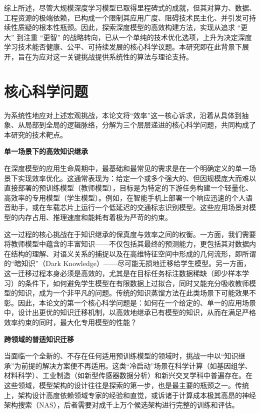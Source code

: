 \documentclass[../main.tex]{subfiles}
\begin{document}
综上所述，尽管大规模深度学习模型已取得里程碑式的成就，但其对算力、数据、工程资源的极端依赖，已构成一个限制其应用广度、阻碍技术民主化、并引发可持续性质疑的根本性瓶颈。因此，探索深度模型的高效构建方法，实现从追求 “更大” 到注重 “更智” 的战略转向，已从一个单纯的技术优化选项，上升为决定深度学习技术能否健康、公平、可持续发展的核心科学议题。本研究即在此背景下展开，旨在为应对这一关键挑战提供系统性的算法与理论支持。

\section[\hspace{-2pt}核心科学问题]{{\heiti{} \hspace{-8pt}核心科学问题}}\label{sec:core-scientific-issues}

为系统性地应对上述宏观挑战，本论文将“效率”这一核心诉求，沿着从具体到抽象、从局部到全局的逻辑脉络，分解为三个层层递进的核心科学问题，共同构成了本研究的技术靶点。

\textbf{ 单一场景下的高效知识继承}

在深度模型的应用生命周期中，最基础和最常见的需求是在一个明确定义的单一场景下实现效率优化。这通常表现为：给定一个或多个强大的、但因规模庞大而难以直接部署的预训练模型（教师模型），目标是为特定的下游任务构建一个轻量化、高效率的专用模型（学生模型）。例如，在智能手机上部署一个响应迅速的个人语音助手，或在车载芯片上运行一个低延迟的交通标志识别模型。这些应用场景对模型的内存占用、推理速度和能耗有着极为严苛的约束。

这一过程的核心挑战在于知识继承的保真度与效率之间的权衡。一方面，我们需要将教师模型中蕴含的丰富知识——不仅包括其最终的预测能力，更包括其对数据内在结构的理解、对语义关系的捕捉以及在高维特征空间中形成的几何流形，即所谓的“暗知识”（Dark Knowledge）——尽可能无损地迁移给学生模型。另一方面，这一迁移过程本身必须是高效的，尤其是在目标任务标注数据稀缺（即少样本学习）的条件下，如何避免学生模型在有限数据上过拟合，同时又能充分吸收教师模型的知识，成为一个非平凡的问题。传统的知识蒸馏方法在此类场景下可能效果不彰。因此，本论文的第一个核心科学问题是：如何在一个给定的、单一的应用场景中，设计出更优的知识迁移机制，以高效地继承已有模型的知识，从而在满足严格效率约束的同时，最大化专用模型的性能？

\textbf{ 跨领域的普适知识迁移}

当面临一个全新的、不存在任何适用预训练模型的领域时，挑战一中以“知识继承”为前提的解决方案便不再适用。这类“冷启动”场景在科学计算（如基因组学、材料科学）、工业制造（如新型传感器数据分析）和新兴交叉学科中普遍存在。在这些领域，模型架构的设计往往是探索的第一步，也是最主要的瓶颈之一。传统上，架构设计高度依赖领域专家的经验和直觉，或诉诸于计算成本极其高昂的神经架构搜索（NAS），后者需要对成千上万个候选架构进行完整的训练和评估。
\end{document}
